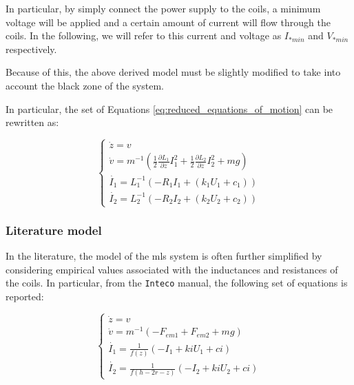 In particular, by simply connect the power supply to the coils, a minimum voltage will be applied and a certain amount of current will flow through the coils.
In the following, we will refer to this current and voltage as $I_{*min}$ and $V_{*min}$ respectively.

Because of this, the above derived model must be slightly modified to take into account the black zone of the system.

In particular, the set of Equations \ref{eq:reduced_equations_of_motion} can be rewritten as:

\begin{equation}
    \begin{cases}
        \dot{z} = v                                                                                                                                 \\
        \dot{v} = m^{-1} \left(\frac{1}{2} \frac{\partial L_1}{\partial z} I_1^2 + \frac{1}{2} \frac{\partial L_2}{\partial z} I_2^2 + m g  \right) \\
        \dot{I_1} = L_1^{-1} \left(- R_1 I_1 + (k_1 U_1 + c_1) \right)                                                                              \\
        \dot{I_2} = L_2^{-1} \left(- R_2 I_2 + (k_2 U_2 + c_2) \right)
    \end{cases}
    \label{eq:reduced_equations_of_motion_final}
\end{equation}


\subsubsection{Literature model}
\label{subsubsec:literature_model}

In the literature, the model of the \acrshort{mls} system is often further simplified by considering empirical values associated with the inductances and resistances of the coils.
In particular, from the \texttt{Inteco} manual, the following set of equations is reported:

\begin{equation}
    \begin{cases}
        \dot{z} = v                                                  \\
        \dot{v} = m^{-1} \left(-F_{em1} + F_{em2} + m g  \right)     \\
        \dot{I_1} = \frac{1}{f(z)} \left(- I_1 + ki U_1 + ci \right) \\
        \dot{I_2} = \frac{1}{f(h - 2r - z)} \left(- I_2 + ki U_2 + ci \right)
    \end{cases}
    \label{eq:simplified_equations_of_motion_final}
\end{equation}

